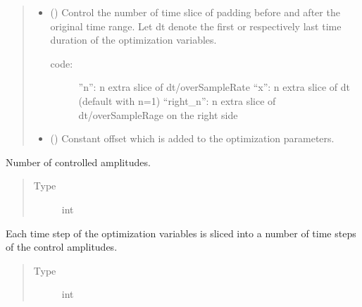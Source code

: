 \documentclass[letterpaper,10pt,english]{sphinxmanual}
\begin{document}
\begin{fulllineitems}
\begin{quote}
\begin{description}
\begin{itemize}
\item {} 
 (\sphinxstyleliteralemphasis{\sphinxupquote{(}}\sphinxstyleliteralemphasis{\sphinxupquote{, }}\sphinxstyleliteralemphasis{\sphinxupquote{)}}) \textendash{} 
Control the number of time slice of padding before and after the
original time range. Let dt denote the first or respectively last time
duration of the optimization variables.
\begin{description}
\item[{code:}] \leavevmode
”n”: n extra slice of dt/overSampleRate
“x”: n extra slice of dt (default with n=1)
“right\_n”: n extra slice of dt/overSampleRage on the right side

\end{description}


\item {} 
 () \textendash{} Constant offset which is added to the optimization parameters.

\end{itemize}

\end{description}\end{quote}

\begin{fulllineitems}
\label{\detokenize{qsim:qsim.transfer_function.TransferFunction.num_ctrls}}
Number of controlled amplitudes.
\begin{quote}\begin{description}
\item[{Type}] \leavevmode
int

\end{description}\end{quote}

\end{fulllineitems}


\begin{fulllineitems}
\label{\detokenize{qsim:qsim.transfer_function.TransferFunction.oversampling}}
Each time step of the optimization variables is sliced into a number
of time steps of the control amplitudes.
\begin{quote}\begin{description}
\item[{Type}] \leavevmode
int


\end{description}
\end{quote}
\end{fulllineitems}
\end{fulllineitems}
\end{document}
